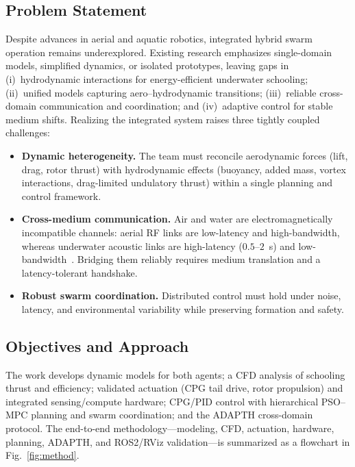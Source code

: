 \documentclass[journal]{IEEEtran}
\begin{document}
\subsection{Problem Statement}
Despite advances in aerial and aquatic robotics, integrated hybrid swarm
operation remains underexplored. Existing research emphasizes single-domain
models, simplified dynamics, or isolated prototypes, leaving gaps in
(i)~hydrodynamic interactions for energy-efficient underwater schooling;
(ii)~unified models capturing aero--hydrodynamic transitions; (iii)~reliable
cross-domain communication and coordination; and (iv)~adaptive control for
stable medium shifts. Realizing the integrated system raises three tightly
coupled challenges:
\begin{itemize}
  \item \textbf{Dynamic heterogeneity.} The team must reconcile aerodynamic
  forces (lift, drag, rotor thrust) with hydrodynamic effects (buoyancy, added
  mass, vortex interactions, drag-limited undulatory thrust) within a single
  planning and control framework.
  \item \textbf{Cross-medium communication.} Air and water are
  electromagnetically incompatible channels: aerial RF links are low-latency and
  high-bandwidth, whereas underwater acoustic links are high-latency
  ($0.5$--$2$~s) and low-bandwidth~\cite{pompili2009underwater,li2023rf}.
  Bridging them reliably requires medium translation and a latency-tolerant
  handshake.
  \item \textbf{Robust swarm coordination.} Distributed control must hold under
  noise, latency, and environmental variability while preserving formation and
  safety.
\end{itemize}

\subsection{Objectives and Approach}
The work develops dynamic models for both agents; a CFD analysis of schooling
thrust and efficiency; validated actuation (CPG tail drive, rotor propulsion) and
integrated sensing/compute hardware; CPG/PID control with hierarchical PSO--MPC
planning and swarm coordination; and the ADAPTH cross-domain protocol. The
end-to-end methodology---modeling, CFD, actuation, hardware, planning, ADAPTH, and
ROS2/RViz validation---is summarized as a flowchart in Fig.~\ref{fig:method}.
\end{document}
